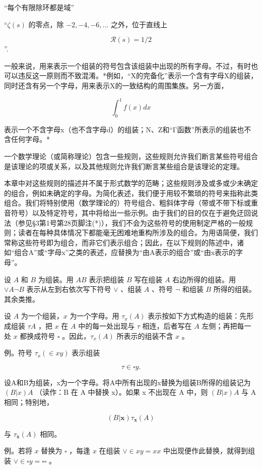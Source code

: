“每个有限除环都是域”

“\(\zeta(s)\) 的零点，除 \(-2, -4, -6, \ldots\) 之外，位于直线上

\[
\mathcal{R}(s) = 1/2
\]''.

一般来说，用来表示一个组装的符号包含该组装中出现的所有字母。不过，有时也可以违反这一原则而不致混淆。*例如，“X的完备化”表示一个含有字母X的组装，同时还含有另一个字母，用来表示X的一致结构的周围集族。另一方面，

\[
\int_ {0} ^ {1} f (x) d x
\]

表示一个不含字母x（也不含字母d）的组装；N、Z和“Γ函数”所表示的组装也不含任何字母。*

一个数学理论（或简称理论）包含一些规则，这些规则允许我们断言某些符号组合是该理论的项或关系，以及其他规则允许我们断言某些组合是该理论的定理。

本章中对这些规则的描述并不属于形式数学的范畴；这些规则涉及或多或少未确定的组合，例如未确定的字母。为简化表述，我们便于用较不繁琐的符号来指称此类组合。我们将特别使用（数学理论的）符号组合、粗斜体字母（带或不带下标或重音符号）以及特定符号，其中将给出一些示例。由于我们的目的仅在于避免迂回说法（参见§3第1号第28页脚注(*)），我们不会为这些符号的使用制定严格的一般规则；读者在每种具体情况下都能毫无困难地重构所涉及的组合。为用语简便，我们常称这些符号即为组合，而非它们表示组合；因此，在以下规则的陈述中，诸如“组合A”或“字母x”之类的表述，应替换为“由A表示的组合”或“由x表示的字母”。

设 \(A\) 和 \(B\) 为组装。用 \(AB\) 表示把组装 \(B\) 写在组装 \(A\) 右边所得的组装。用 \(\vee A \neg B\) 表示从左到右依次写下符号 \(\vee\) 、组装 \(A\) 、符号 \(\neg\) 和组装 \(B\) 所得的组装。其余类推。

设 \(A\) 为一个组装，\(x\) 为一个字母。用 \(\tau_{x}(A)\) 表示按如下方式构造的组装：先形成组装 \(\tau A\) ，把 \(x\) 在 \(A\) 中的每一处出现与 \(\tau\) 相连，后者写在 \(A\) 左侧；再把每一处 \(x\) 都换成符号 \(\square\) 。因此，\(\tau_{x}(A)\) 所表示的组装不含 \(x\) 。

例。符号 \(\tau_{x}(\in xy)\) 表示组装

\[
\tau \in \square y.
\]

设A和B为组装，x为一个字母。将A中所有出现的x替换为组装B所得的组装记为 \((B|x)A\) （读作：B 在 A 中替换 x）。如果 x 不出现在 A 中，则 \((B|x)A\) 与 A 相同；特别地，

\[
(B | \boldsymbol {x}) \tau_ {\boldsymbol {x}} (A)
\]

与 \(\tau_{\mathbf{x}}(A)\) 相同。

例。若将 \(x\) 替换为 \(\square\) ，每逢 \(x\) 在组装 \(\vee \in xy = xx\) 中出现便作此替换，就得到组装 \(\vee \in \square y = \square \square\) 。

